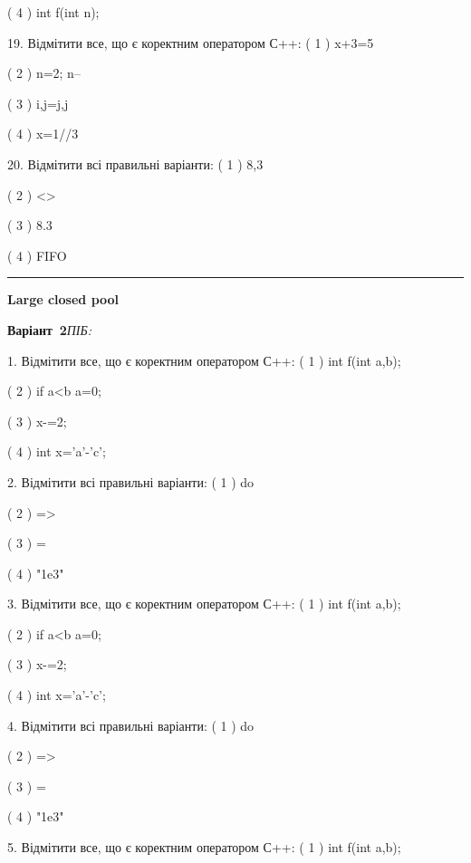 \documentclass[11pt]{article}
\begin{document}
( 4 ) int f(int n);

19. Відмітити все, що є коректним оператором С++:
( 1 ) x+3=5

( 2 ) n=2; n--

( 3 ) i,j=j,j

( 4 ) x=1//3

20. Відмітити всі правильні варіанти:
( 1 ) 8,3

( 2 ) <>

( 3 ) 8.3

( 4 ) FIFO





















\vspace{10mm}
\noindent\rule{\textwidth}{0.3pt}
\vspace{8mm}
{\large\textbf{Large closed pool}}

\textbf{Варіант \No\,2}\hfill \textit{ПІБ:}\,\underline{\hspace{60mm}}
\vspace{4mm}

1. Відмітити все, що є коректним оператором С++:
( 1 ) int f(int a,b);

( 2 ) if a<b a=0;

( 3 ) x-=2;

( 4 ) int x='a'-'c';

2. Відмітити всі правильні варіанти:
( 1 ) do

( 2 ) =>

( 3 ) =

( 4 ) "1e3"

3. Відмітити все, що є коректним оператором С++:
( 1 ) int f(int a,b);

( 2 ) if a<b a=0;

( 3 ) x-=2;

( 4 ) int x='a'-'c';

4. Відмітити всі правильні варіанти:
( 1 ) do

( 2 ) =>

( 3 ) =

( 4 ) "1e3"

5. Відмітити все, що є коректним оператором С++:
( 1 ) int f(int a,b);
\end{document}
